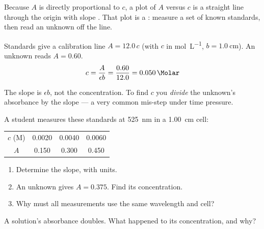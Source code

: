 \documentclass{apchem-notes}
\begin{document}
Because $A$ is directly proportional to $c$, a plot of $A$ versus $c$ is a
straight line through the origin with slope
. That plot is a
: measure a set of known standards, then read an
unknown off the line.

\begin{workedexample}
Standards give a calibration line $A = 12.0\,c$ (with $c$ in
\si{\mole\per\liter}, $b = \SI{1.0}{\centi\meter}$). An unknown reads
$A = 0.60$.
\[
  c = \frac{A}{\epsilon b} = \frac{0.60}{12.0} = \SI{0.050}{\Molar}
\]
\end{workedexample}

\begin{apctrap}
The slope is $\epsilon b$, not the concentration. To find $c$ you
\emph{divide} the unknown's absorbance by the slope --- a very common
mis-step under time pressure.
\end{apctrap}


A student measures these standards at \SI{525}{\nano\meter} in a
\SI{1.00}{\centi\meter} cell:

\renewcommand{\arraystretch}{1.25}
\begin{center}
\begin{tabular}{@{}cccc@{}}
\toprule
$c$ (M) & 0.0020 & 0.0040 & 0.0060\\
$A$ & 0.150 & 0.300 & 0.450\\
\bottomrule
\end{tabular}
\end{center}

\begin{enumerate}[leftmargin=*,itemsep=0.4em]
  \item Determine the slope, with units. \workspace[1.8cm]
  \item An unknown gives $A = 0.375$. Find its concentration.
  \item Why must all measurements use the same wavelength and cell?
\end{enumerate}

\begin{exitticket}
A solution's absorbance doubles. What happened to its concentration, and
why? 
\end{exitticket}
\end{document}
